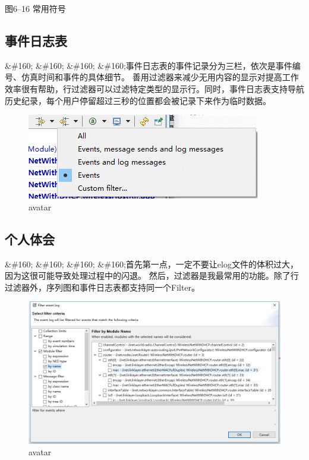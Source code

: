 图6--16 常用符号

\subsection{事件日志表}
\label{事件日志表}

\&\#160; \&\#160; \&\#160; \&\#160;事件日志表的事件记录分为三栏，依次是事件编号、仿真时间和事件的具体细节。
善用过滤器来减少无用内容的显示对提高工作效率很有帮助，行过滤器可以过滤特定类型的显示行。同时，事件日志表支持导航历史纪录，每个用户停留超过三秒的位置都会被记录下来作为临时数据。

\begin{figure}[htbp]
\centering
\includegraphics[keepaspectratio,width=\textwidth,height=0.75\textheight]{./../img/chapter6/6-13.png}
\caption{avatar}
\end{figure}

\subsection{个人体会}
\label{个人体会}

\&\#160; \&\#160; \&\#160; \&\#160;首先第一点，一定不要让elog文件的体积过大，因为这很可能导致处理过程中的闪退。
然后，过滤器是我最常用的功能。除了行过滤器外，序列图和事件日志表都支持同一个Filter。

\begin{figure}[htbp]
\centering
\includegraphics[keepaspectratio,width=\textwidth,height=0.75\textheight]{./../img/chapter6/6-14.png}
\caption{avatar}
\end{figure}

